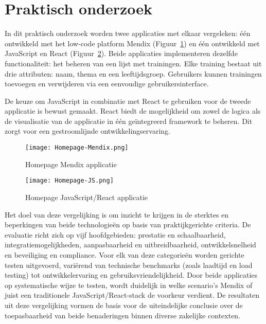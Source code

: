 \section{Praktisch onderzoek}
In dit praktisch onderzoek worden twee applicaties met elkaar vergeleken: één ontwikkeld met het low-code platform Mendix (Figuur~\ref{fig:homepage-mendix}) en één ontwikkeld met JavaScript en React (Figuur~\ref{fig:homepage-JavaScript}). Beide applicaties implementeren dezelfde functionaliteit: het beheren van een lijst met trainingen. Elke training bestaat uit drie attributen: naam, thema en een leeftijdsgroep. Gebruikers kunnen trainingen toevoegen en verwijderen via een eenvoudige gebruikersinterface.

De keuze om JavaScript in combinatie met React te gebruiken voor de tweede applicatie is bewust gemaakt. React biedt de mogelijkheid om zowel de logica als de visualisatie van de applicatie in één geïntegreerd framework te beheren. Dit zorgt voor een gestroomlijnde ontwikkelingservaring.

\begin{figure}[H]
    \centering
    \captionsetup{justification=centering} 
    \texttt{[image: Homepage-Mendix.png]}
    \caption[Homepage Mendix applicatie]{\label{fig:homepage-mendix} Homepage Mendix applicatie }
\end{figure}

\begin{figure}[H]
    \centering
    \captionsetup{justification=centering}
    \texttt{[image: Homepage-JS.png]}
    \caption[Homepage Mendix applicatie]{\label{fig:homepage-JavaScript} Homepage JavaScript/React applicatie }
\end{figure}

Het doel van deze vergelijking is om inzicht te krijgen in de sterktes en beperkingen van beide technologieën op basis van praktijkgerichte criteria. De evaluatie richt zich op vijf hoofdgebieden: prestatie en schaalbaarheid, integratiemogelijkheden, aanpasbaarheid en uitbreidbaarheid, ontwikkelsnelheid en beveiliging en compliance. Voor elk van deze categorieën worden gerichte testen uitgevoerd, variërend van technische benchmarks (zoals laadtijd en load testing) tot ontwikkelervaring en gebruiksvriendelijkheid. Door beide applicaties op systematische wijze te testen, wordt duidelijk in welke scenario’s Mendix of juist een traditionele JavaScript/React-stack de voorkeur verdient. De resultaten uit deze vergelijking vormen de basis voor de uiteindelijke conclusie over de toepasbaarheid van beide benaderingen binnen diverse zakelijke contexten.
